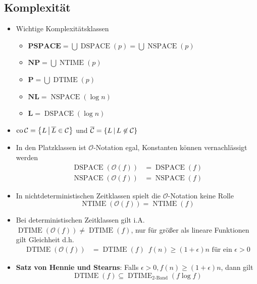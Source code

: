 \documentclass[landscape, 8pt, a4paper]{extarticle}
\newcommand{\poly}{\textbf{P}}
\newcommand{\npoly}{\textbf{NP}}
\newcommand{\set}[2]{\ensuremath\left\{ #1 \,\middle|\, #2 \right\}}
\begin{document}
\begin{multicols}{3}
	\section{Komplexität}
	\begin{itemize}
		\item Wichtige Komplexitätsklassen \begin{itemize}
			\item $\textbf{PSPACE}=\bigcup \operatorname{DSPACE}(p)=\bigcup \operatorname{NSPACE}(p)$
			\item $\npoly = \bigcup \operatorname{NTIME}(p)$
			\item $\poly = \bigcup \operatorname{DTIME}(p)$
			\item $\textbf{NL}=\operatorname{NSPACE}(\log n)$
			\item $\textbf{L}=\operatorname{DSPACE}(\log n)$
		\end{itemize}
		\item $\operatorname{co}\mathcal C=\set{L}{\overline L\in \mathcal C}$ und $\overline{\mathcal C}=\set{L}{L\not \in \mathcal C}$
		\item In den Platzklassen ist $\mathcal O$-Notation egal, Konstanten können vernachlässigt werden
		\begin{align*}
			\operatorname{DSPACE}(\mathcal O(f))&=\operatorname{DSPACE}(f)\\
			\operatorname{NSPACE}(\mathcal O(f))&=\operatorname{NSPACE}(f)
		\end{align*}
		\item In nichtdeterministischen Zeitklassen spielt die $\mathcal O$-Notation keine Rolle
		\begin{equation*}
			\operatorname{NTIME}(\mathcal O(f))=\operatorname{NTIME}(f)
		\end{equation*}
		\item Bei deterministischen Zeitklassen gilt i.A. $\operatorname{DTIME}(\mathcal O(f))\not=\operatorname{DTIME}(f)$, nur für größer als lineare Funktionen gilt Gleichheit d.h.
		\begin{align*}
			\operatorname{DTIME}(\mathcal O(f))&=\operatorname{DTIME}(f) \enspace f(n)\geq (1+\epsilon)n\text{ für ein }\epsilon>0
		\end{align*}
		\item \textbf{Satz von Hennie und Stearns}: Falls $\epsilon>0, f(n)\geq (1+\epsilon)n$, dann gilt
		\begin{equation*}
			\operatorname{DTIME}(f)\subseteq\operatorname{DTIME}_{\text{2-Band}}(f\log f)
		\end{equation*}

\end{itemize}
\end{multicols}
\end{document}
